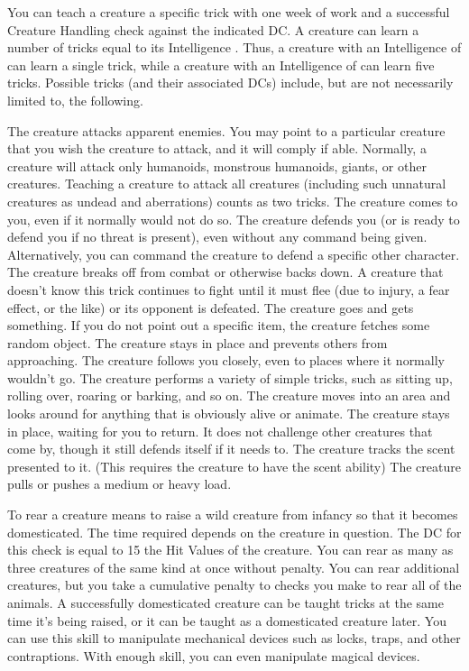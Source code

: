  You can teach a creature a specific trick with one week of work and a successful Creature Handling check against the indicated DC. A creature can learn a number of tricks equal to its Intelligence . Thus, a creature with an Intelligence of  can learn a single trick, while a creature with an Intelligence of  can learn five tricks. Possible tricks (and their associated DCs) include, but are not necessarily limited to, the following.

 The creature attacks apparent enemies. You may point to a particular creature that you wish the creature to attack, and it will comply if able. Normally, a creature will attack only humanoids, monstrous humanoids, giants, or other creatures. Teaching a creature to attack all creatures (including such unnatural creatures as undead and aberrations) counts as two tricks.
 The creature comes to you, even if it normally would not do so.
 The creature defends you (or is ready to defend you if no threat is present), even without any command being given. Alternatively, you can command the creature to defend a specific other character.
 The creature breaks off from combat or otherwise backs down. A creature that doesn't know this trick continues to fight until it must flee (due to injury, a fear effect, or the like) or its opponent is defeated.
 The creature goes and gets something. If you do not point out a specific item, the creature fetches some random object.
 The creature stays in place and prevents others from approaching.
 The creature follows you closely, even to places where it normally wouldn't go.
 The creature performs a variety of simple tricks, such as sitting up, rolling over, roaring or barking, and so on.
 The creature moves into an area and looks around for anything that is obviously alive or animate.
 The creature stays in place, waiting for you to return. It does not challenge other creatures that come by, though it still defends itself if it needs to.
 The creature tracks the scent presented to it. (This requires the creature to have the scent ability)
 The creature pulls or pushes a medium or heavy load.

 To rear a creature means to raise a wild creature from infancy so that it becomes domesticated. The time required depends on the creature in question. The DC for this check is equal to 15 \add the Hit Values of the creature. You can rear as many as three creatures of the same kind at once without penalty. You can rear additional creatures, but you take a cumulative  penalty to checks you make to rear all of the animals. A successfully domesticated creature can be taught tricks at the same time it's being raised, or it can be taught as a domesticated creature later.
You can use this skill to manipulate mechanical devices such as locks, traps, and other contraptions. With enough skill, you can even manipulate magical devices.

